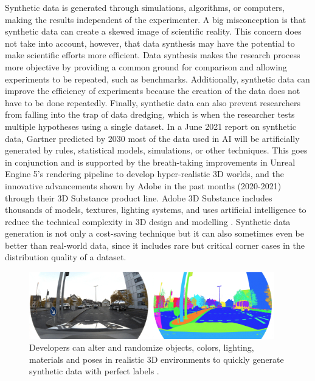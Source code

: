 Synthetic data is generated through simulations, algorithms, or computers, making the results independent of the experimenter. 
A big misconception is that synthetic data can create a skewed image of scientific reality. This concern does not take into account, however, that data synthesis may have the potential to make scientific efforts more efficient. Data synthesis makes the research process more objective by providing a common ground for comparison and allowing experiments to be repeated, such as benchmarks. Additionally, synthetic data can improve the efficiency of experiments because the creation of the data does not have to be done repeatedly. Finally, synthetic data can also prevent researchers from falling into the trap of data dredging, which is when the researcher tests multiple hypotheses using a single dataset. In a June 2021 report on synthetic data\cite{gartner_inc2021synthetic}, Gartner predicted by 2030 most of the data used in AI will be artificially generated by rules, statistical models, simulations, or other techniques. This goes in conjunction and is supported by the breath-taking improvements in Unreal Engine 5's rendering pipeline \cite{unreal5_2021} to develop hyper-realistic 3D worlds, and the innovative advancements shown by Adobe in the past months (2020-2021) through their 3D Substance product line. Adobe 3D Substance includes thousands of models, textures, lighting systems, and uses artificial intelligence to reduce the technical complexity in 3D design and modelling \cite{adobe2021creative3D}. Synthetic data generation is not only a cost-saving technique but it can also sometimes even be better than real-world data, since it includes rare but critical corner cases in the distribution quality of a dataset. 

\begin{figure}[!ht]
    \centering
    \includegraphics[width=0.95\textwidth]{images/synthetic-data.png}
    \caption{ Developers can alter and randomize objects, colors, lighting, materials and poses in realistic 3D environments to quickly generate synthetic data with perfect labels \cite{8_andrews_2021}.
    }
    \label{fig:synthetic-data}
\end{figure}
    
